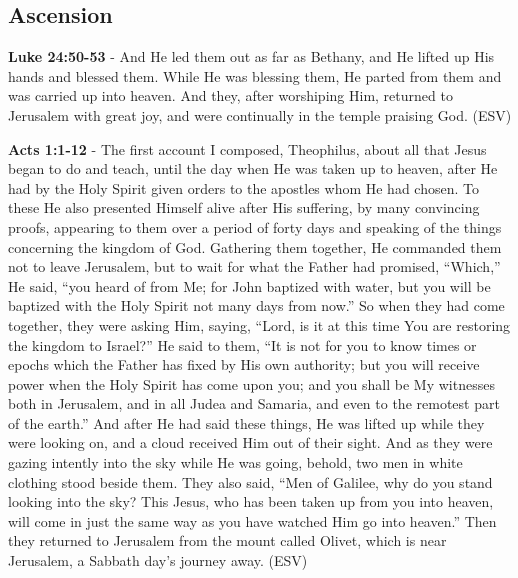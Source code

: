 \documentclass[11pt]{article}
\begin{document}
\subsection{Ascension}
\label{sec:org861c22c}
\textbf{Luke 24:50-53} - And He led them out as far as Bethany, and He lifted up His hands and blessed them. While He was blessing them, He parted from them and was carried up into heaven. And they, after worshiping Him, returned to Jerusalem with great joy, and were continually in the temple praising God. (ESV)

\textbf{Acts 1:1-12} - The first account I composed, Theophilus, about all that Jesus began to do and teach, until the day when He was taken up to heaven, after He had by the Holy Spirit given orders to the apostles whom He had chosen. To these He also presented Himself alive after His suffering, by many convincing proofs, appearing to them over a period of forty days and speaking of the things concerning the kingdom of God. Gathering them together, He commanded them not to leave Jerusalem, but to wait for what the Father had promised, “Which,” He said, “you heard of from Me; for John baptized with water, but you will be baptized with the Holy Spirit not many days from now.” So when they had come together, they were asking Him, saying, “Lord, is it at this time You are restoring the kingdom to Israel?” He said to them, “It is not for you to know times or epochs which the Father has fixed by His own authority; but you will receive power when the Holy Spirit has come upon you; and you shall be My witnesses both in Jerusalem, and in all Judea and Samaria, and even to the remotest part of the earth.” And after He had said these things, He was lifted up while they were looking on, and a cloud received Him out of their sight. And as they were gazing intently into the sky while He was going, behold, two men in white clothing stood beside them. They also said, “Men of Galilee, why do you stand looking into the sky? This Jesus, who has been taken up from you into heaven, will come in just the same way as you have watched Him go into heaven.” Then they returned to Jerusalem from the mount called Olivet, which is near Jerusalem, a Sabbath day’s journey away. (ESV)
\end{document}
